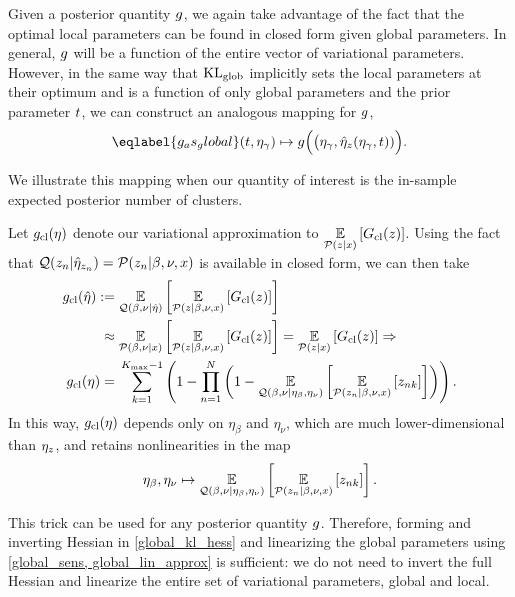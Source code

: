 
Given a posterior quantity $g$,
we again take advantage of the fact that the optimal
local parameters can be found in closed form given global parameters.
In general, $g$ will be a function of the entire vector of variational parameters.
However, in the same way that $\mathrm{KL}_{\mathrm{glob}}$ implicitly sets the local parameters at their optimum
and is a function of only global parameters and the prior parameter $t$,
we can construct an analogous mapping for $g$,
\begin{align}\eqlabel{g_as_global}
(\t, \etaglob) \mapsto g\Big(\big(\etaglob, \etaoptz(\etaglob, \t))\Big).
\end{align}

We illustrate this mapping
when our quantity of interest is the in-sample expected posterior number of clusters.

\begin{ex}
%
Let
$g_{\text{cl}}(\eta)$ denote our variational approximation to
$\underset{\mathcal{P}(z\vert x)}{\mathbb{E}}\left[G_{\text{cl}}(z)\right]$.   Using the fact that
$\mathcal{Q}(z_n \vert \hat\eta_{z_n}) = \mathcal{P}(z_n\vert \beta, \nu, x)$ is available in closed form, we can then take
%
\begin{align*}
%
\gclustersabbr(\etaopt) :={}&
    \expect{\q(\beta, \nu \vert\etaopt)}{
        \expect{\p(\z \vert \beta, \nu, \x)}{\nclusters(\z)}
    }
\\\approx{}&
    \expect{\p(\beta, \nu \vert \x)}{
        \expect{\p(\z \vert \beta, \nu, \x)}{\nclusters(\z)}
    }
    = \expect{\p(\z\vert\x)}{\nclusters(\z)} \Rightarrow \\
%
\gclustersabbr(\eta) ={}&
    \sumkm \left(1 -  \prod_{\n=1}^\N
        \left(1 - \expect{\q(\beta, \nu \vert \eta_\beta, \eta_\nu)}
                    {\expect{\p(\z_{\n} \vert \beta, \nu, \x)}{\z_{\n\k}}}
                    \right)\right).
%
\end{align*}
%
In this way, $g_{\text{cl}}(\eta)$ depends only on $\eta_\beta$ and $\eta_\nu$,
which are much lower-dimensional than $\eta_z$, and retains nonlinearities in
the map
%
\begin{align*}
%
\eta_\beta, \eta_\nu \mapsto \expect{\q(\beta, \nu \vert \eta_\beta,
\eta_\nu)} {\expect{\p(\z_{\n} \vert \beta, \nu, \x)}{\z_{\n\k}}}.
%
\end{align*}
%
\end{ex}


This trick can be used for any posterior quantity $g$.
Therefore, forming and inverting Hessian in \eqref{global_kl_hess}
and linearizing the global parameters using \eqref{global_sens, global_lin_approx} is sufficient:
we do not need to invert the full Hessian
and linearize the entire set of variational parameters, global and local.
